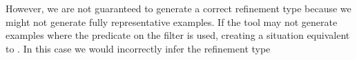 However, we are not guaranteed to generate a correct refinement type because we might not generate fully representative examples.
If the tool may not generate examples where the predicate on the filter is used, creating a situation equivalent to .
In this case we would incorrectly infer the refinement type 